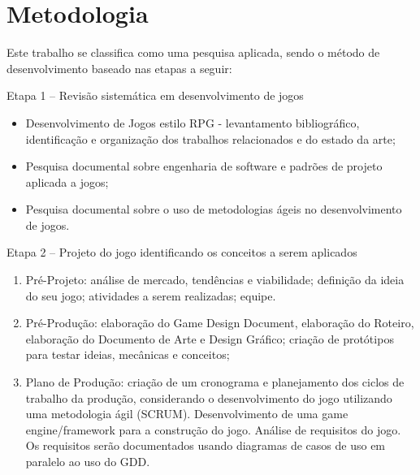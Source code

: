 \documentclass[12pt, 
openright, 
oneside, 
a4paper,    
brazil]{facom-ufu-abntex2}
\begin{document}
\iffalse
\section{Metodologia}


Este trabalho se classifica como uma pesquisa aplicada, sendo o método de desenvolvimento baseado nas etapas a seguir:

Etapa 1 – Revisão sistemática em desenvolvimento de jogos
\begin{itemize}
\item Desenvolvimento de Jogos estilo RPG - levantamento bibliográfico, identificação e organização dos trabalhos relacionados e do estado da arte;
\item Pesquisa documental sobre engenharia de software e padrões de projeto aplicada a jogos;
\item Pesquisa documental sobre o uso de metodologias ágeis no desenvolvimento de jogos.
\end{itemize}

Etapa 2 – Projeto do jogo identificando os conceitos a serem aplicados 
\begin{enumerate}
\item Pré-Projeto: análise de mercado, tendências e viabilidade;
definição da ideia do seu jogo; atividades a serem realizadas;
equipe.
\item Pré-Produção: elaboração do Game Design Document, elaboração do Roteiro, elaboração do Documento de Arte e Design Gráfico; criação de protótipos para testar ideias, mecânicas e conceitos;
\item Plano de Produção: criação de um cronograma e planejamento dos ciclos de trabalho da produção, considerando o desenvolvimento do jogo utilizando uma  metodologia ágil (SCRUM). Desenvolvimento de uma game engine/framework para a construção do jogo. Análise de requisitos do jogo. Os requisitos serão documentados usando diagramas de casos de uso em paralelo ao uso do GDD.
\end{enumerate}
\end{document}
